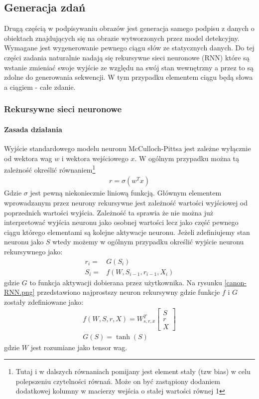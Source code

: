 \subsection{Generacja zdań}
Drugą częścią w podpisywaniu obrazów jest generacja samego podpisu z danych o obiektach znajdujących się na obrazie wytworzonych przez model detekcyjny. Wymagane jest wygenerowanie pewnego ciągu słów ze statycznych danych. Do tej części zadania naturalnie nadają się rekursywne sieci neuronowe (RNN) które są wstanie zmieniać swoje wyjście ze względu na swój stan wewnętrzny a przez to są zdolne do generowania sekwencji.\cite{RNN-in-cg} W tym przypadku elementem ciągu będą słowa a ciągiem - całe zdanie.
\subsubsection{Rekursywne sieci neuronowe}
\paragraph{Zasada działania}
Wyjście standardowego modelu neuronu McCulloch-Pittsa jest zależne wyłącznie od wektora wag $w$ i wektora wejściowego $x$. W ogólnym przypadku można tą zależność określić równaniem\footnote{Tutaj i w dalszych równaniach pomijany jest element stały (tzw bias) w celu polepszeniu czytelności równań. Może on być zastąpiony dodaniem dodatkowej kolumny w macierzy wejścia o stałej wartości równej 1} 
\label{eqn:basic-neuron}
\begin{align*}  
    r = \sigma(w^Tx)
\end{align*}
Gdzie $\sigma$ jest pewną niekoniecznie liniową funkcją. \cite[p.~5]{nn-basic}
Głównym elementem wprowadzanym przez neurony rekursywne jest zależność wartości wyjściowej od poprzednich wartości wyjścia. Zależność ta sprawia że nie można już interpretować wyjścia neuronu jako osobnej wartości lecz jako część pewnego ciągu którego elementami są kolejne aktywacje neuronu. \cite[p.~7]{LSTM-intro} Jeżeli zdefiniujemy stan neuronu jako $S$ wtedy możemy w ogólnym przypadku określić wyjście neuronu rekursywnego jako:
\label{eqn:rnn-neuron}
\begin{align*}
    r_i =& G(S_i) \\
    S_i =& f(W,S_{i-1},r_{i-1},X_i)
\end{align*}
gdzie $G$ to funkcja aktywacji dobierana przez użytkownika.
Na rysunku \ref{canon-RNN.png} przedstawiono najprostszy neuron rekursywny gdzie funkcje $f$ i $G$ zostały zdefiniowane jako:
\begin{align*}  
    f(W,S,r,X) = W^T_{s,r,x}\begin{bmatrix} S \\ r \\ X \end{bmatrix} \\
    G(S) = \tanh(S)
\end{align*}
gdzie $W$ jest rozumiane jako tensor wag.
